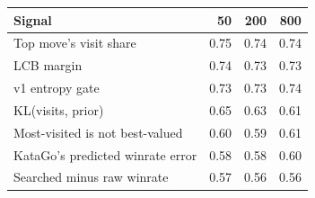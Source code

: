 \begin{tabular}{lrrr}
\toprule
Signal & 50 & 200 & 800 \\
\midrule
Top move's visit share & 0.75 & 0.74 & 0.74 \\
LCB margin & 0.74 & 0.73 & 0.73 \\
v1 entropy gate & 0.73 & 0.73 & 0.74 \\
KL(visits, prior) & 0.65 & 0.63 & 0.61 \\
Most-visited is not best-valued & 0.60 & 0.59 & 0.61 \\
KataGo's predicted winrate error & 0.58 & 0.58 & 0.60 \\
Searched minus raw winrate & 0.57 & 0.56 & 0.56 \\
\bottomrule
\end{tabular}
